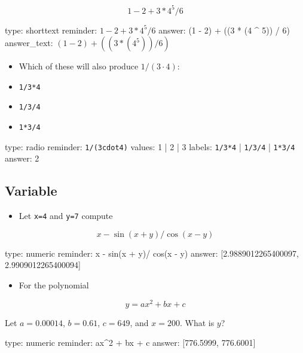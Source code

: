 \documentclass[12pt]{article}
\begin{document}
\[
1 - 2 + 3 * 4 ^ 5 / 6
\]

\begin{answer}
type: shorttext
reminder: \( 1 - 2 + 3 * 4 ^ 5 / 6 \)
answer: (1 - 2) + ((3 * (4 ^ 5)) / 6)
answer_text: \( (1 - 2) + ((3 * (4 ^ 5)) / 6) \) 
\end{answer}

\begin{itemize}
\item
  Which of these will also produce $1/(3\cdot4)$:
\item
  \texttt{1/3*4}
\item
  \texttt{1/3/4}
\item
  \texttt{1*3/4}
\end{itemize}

\begin{answer}
type: radio
reminder: \verb+1/(3cdot4)+
values: 1 | 2 | 3
labels: \verb+1/3*4+ | \verb+1/3/4+ | \verb+1*3/4+
answer: 2
\end{answer}

\subsection{Variable}

\begin{itemize}
\itemsep1pt\parskip0pt
\item
  Let \texttt{x=4} and \texttt{y=7} compute
\end{itemize}

\[
x - \sin(x + y)/\cos(x - y)
\]

\begin{answer}
    type: numeric
    reminder: x - sin(x + y)/ cos(x - y)
    answer: [2.9889012265400097, 2.9909012265400094]

\end{answer}

\begin{itemize}
\itemsep1pt\parskip0pt
\item
  For the polynomial
\end{itemize}

\[
y = ax^2 + bx + c
\]

Let $a=0.00014$, $b=0.61$, $c=649$, and $x=200$. What is $y$?

\begin{answer}
    type: numeric
    reminder: ax^2 + bx + c
    answer: [776.5999, 776.6001]

\end{answer}
\end{document}
